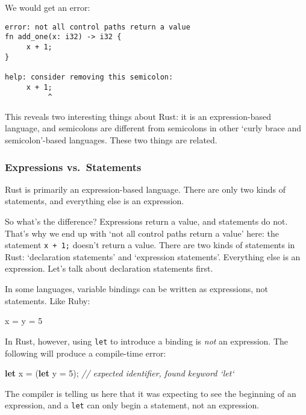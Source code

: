 \documentclass[a4paper,]{book}
\newenvironment{Shaded}{\begin{snugshade}}{\end{snugshade}}
\newcommand{\KeywordTok}[1]{\textcolor[rgb]{0.13,0.29,0.53}{\textbf{{#1}}}}
\newcommand{\DecValTok}[1]{\textcolor[rgb]{0.00,0.00,0.81}{{#1}}}
\newcommand{\CommentTok}[1]{\textcolor[rgb]{0.56,0.35,0.01}{\textit{{#1}}}}
\newcommand{\NormalTok}[1]{{#1}}
\begin{document}
We would get an error:

\begin{verbatim}
error: not all control paths return a value
fn add_one(x: i32) -> i32 {
     x + 1;
}

help: consider removing this semicolon:
     x + 1;
          ^
\end{verbatim}

This reveals two interesting things about Rust: it is an
expression-based language, and semicolons are different from semicolons
in other `curly brace and semicolon'-based languages. These two things
are related.

\subsubsection{Expressions
vs.~Statements}\label{expressions-vs.statements}

Rust is primarily an expression-based language. There are only two kinds
of statements, and everything else is an expression.

So what's the difference? Expressions return a value, and statements do
not. That's why we end up with `not all control paths return a value'
here: the statement \texttt{x\ +\ 1;} doesn't return a value. There are
two kinds of statements in Rust: `declaration statements' and
`expression statements'. Everything else is an expression. Let's talk
about declaration statements first.

In some languages, variable bindings can be written as expressions, not
statements. Like Ruby:

\begin{Shaded}
\begin{Highlighting}[]
\NormalTok{x = y = }\DecValTok{5}
\end{Highlighting}
\end{Shaded}

In Rust, however, using \texttt{let} to introduce a binding is
\emph{not} an expression. The following will produce a compile-time
error:

\begin{Shaded}
\begin{Highlighting}[]
\KeywordTok{let} \NormalTok{x = (}\KeywordTok{let} \NormalTok{y = }\DecValTok{5}\NormalTok{); }\CommentTok{// expected identifier, found keyword `let`}
\end{Highlighting}
\end{Shaded}

The compiler is telling us here that it was expecting to see the
beginning of an expression, and a \texttt{let} can only begin a
statement, not an expression.
\end{document}
